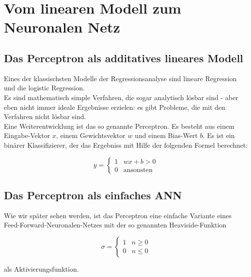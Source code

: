 ﻿\section{Vom linearen Modell zum Neuronalen Netz}

\subsection{Das Perceptron als additatives lineares Modell}
Eines der klassischsten Modelle der Regressionsanalyse sind lineare Regression und die logistic Regression. \\

Es sind mathematisch simple Verfahren, die sogar analytisch lösbar sind - aber eben nicht immer ideale Ergebnisse erzielen: es gibt Probleme, die mit den Verfahren nicht lösbar sind. 
\\

Eine Weiterentwicklung ist das so genannte Perceptron.
Es besteht aus einem Eingabe-Vektor $x$, einem Gewichtsvektor $w$ und einem Bias-Wert $b$. Es ist ein binärer Klassifizierer, der das Ergebniss mit Hilfe der folgenden Formel berechnet:

\begin{equation}
    y = \begin{cases}
               1               & w x + b > 0\\
               0               & \text{ansonsten}
           \end{cases}
\end{equation}


\subsection{Das Perceptron als einfaches ANN}

Wie wir später sehen werden, ist das Perceptron eine einfache Variante eines Feed-Forward-Neuronalen-Netzes mit der so genannten Heaviside-Funktion

\begin{equation}
    \sigma = \begin{cases}
               1               & n \geq 0\\
               0               & n \leq 0
           \end{cases}
\end{equation}

als Aktivierungsfunktion.\\

